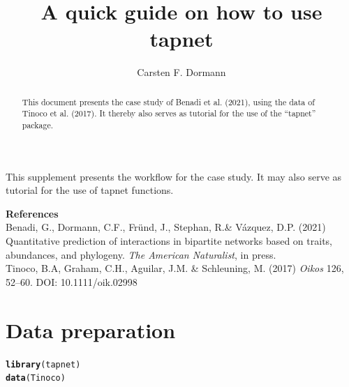 \documentclass[a4paper, 11pt]{article}\usepackage[]{graphicx}\usepackage[]{color}
\makeatletter
\newcommand{\hlstd}[1]{\textcolor[rgb]{0.345,0.345,0.345}{#1}}%
\newcommand{\hlkwd}[1]{\textcolor[rgb]{0.737,0.353,0.396}{\textbf{#1}}}%
\newenvironment{kframe}{%
 \def\at@end@of@kframe{}%
 \ifinner\ifhmode%
  \def\at@end@of@kframe{\end{minipage}}%
  \begin{minipage}{\columnwidth}%
 \fi\fi%
 \def\FrameCommand##1{\hskip\@totalleftmargin \hskip-\fboxsep
 \colorbox{shadecolor}{##1}\hskip-\fboxsep
     \hskip-\linewidth \hskip-\@totalleftmargin \hskip\columnwidth}%
 \MakeFramed {\advance\hsize-\width
   \@totalleftmargin\z@ \linewidth\hsize
   \@setminipage}}%
 {\par\unskip\endMakeFramed%
 \at@end@of@kframe}
\newenvironment{knitrout}{}{} %
\makeatother
\begin{document}
\title{A quick guide on how to use tapnet}

\author{Carsten F. Dormann}

\maketitle






\begin{abstract}
\noindent This document presents the case study of Benadi et al. (2021), using the data of Tinoco et al. (2017). It thereby also serves as tutorial for the use of the ``tapnet'' package.
\end{abstract}

\tableofcontents

\bigskip

\bigskip

This supplement presents the workflow for the case study. It may also serve as tutorial for the use of tapnet functions.

\textbf{References}\\
Benadi, G., Dormann, C.F., Fründ, J., Stephan, R.\& Vázquez, D.P. (2021) Quantitative prediction of interactions in bipartite networks based on traits, abundances, and phylogeny. \emph{The American Naturalist}, in press. \\
Tinoco, B.A, Graham, C.H., Aguilar, J.M. \& Schleuning, M. (2017) \emph{Oikos} 126, 52--60. DOI: 10.1111/oik.02998

\clearpage
\section{Data preparation}
\begin{knitrout}\small
{}\color{fgcolor}\begin{kframe}
\begin{alltt}
\hlkwd{library}\hlstd{(tapnet)}
\hlkwd{data}\hlstd{(Tinoco)}
\end{alltt}
\end{kframe}
\end{knitrout}
\end{document}
